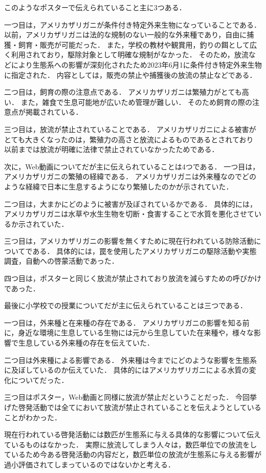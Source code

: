 \documentclass[12pt,a4j,titlepage]{ltjsarticle}
\begin{document}
このようなポスターで伝えられていること主に3つある．

一つ目は，アメリカザリガニが条件付き特定外来生物になっていることである．
以前，アメリカザリガニは法的な規制のない一般的な外来種であり，自由に捕獲・飼育・販売が可能だった．
また，学校の教材や観賞用，釣りの餌として広く利用されており，駆除対象として明確な規制がなかった．
そのため，放流などにより生態系への影響が深刻化されたため2023年6月1に条件付き特定外来生物に指定された．
内容としては，販売の禁止や捕獲後の放流の禁止などである．

二つ目は，飼育の際の注意点である．
アメリカザリガニは繁殖力がとても高い．
また，雑食で生息可能地が広いため管理が難しい．
そのため飼育の際の注意点が掲載されている．

三つ目は，放流が禁止されていることである．
アメリカザリガニによる被害がとても大きくなったのは，繁殖力の高さと放流によるものであるとされており
以前までは放流が明確に法律で禁止されていなかったためである．

次に，Web動画についてだが主に伝えられていることは4つである．
一つ目は，アメリカザリガニの繁殖の経緯である．
アメリカザリガニは外来種なのでどのような経緯で日本に生息するようになり繁殖したのかが示されていた．

二つ目は，大まかにどのように被害が及ぼされているかである．
具体的には，アメリカザリガニは水草や水生生物を切断・食害することで水質を悪化させているか示されていた．

三つ目は，アメリカザリガニの影響を無くすために現在行われている防除活動についてである．
具体的には，罠を使用したアメリカザリガニの駆除活動や実態調査，自動への啓蒙活動であった．

四つ目は，ポスターと同じく放流が禁止されており放流を減らすための呼びかけであった．

最後に小学校での授業についてだが主に伝えられていることは三つである．

一つ目は，外来種と在来種の存在である．
アメリカザリガニの影響を知る前に，身近な環境に生息している生物には元から生息していた在来種や，様々な影響で生息している外来種の存在を伝えていた．

二つ目は外来種による影響である．
外来種は今までにどのような影響を生態系に及ぼしているのか伝えていた．
具体的にはアメリカザリガニによる水質の変化についてだった．

三つ目はポスター，Web動画と同様に放流が禁止だということだった．
今回挙げた啓発活動では全てにおいて放流が禁止されていることを伝えようとしていることがわかった．

現在行われている啓発活動には数匹が生態系に与える具体的な影響について伝えているものはなかった．
実際に放流してしまう人々は，数匹単位での放流をしているため今ある啓発活動の内容だと，数匹単位の放流が生態系に与える影響が過小評価されてしまっているのではないかと考える．
\end{document}
